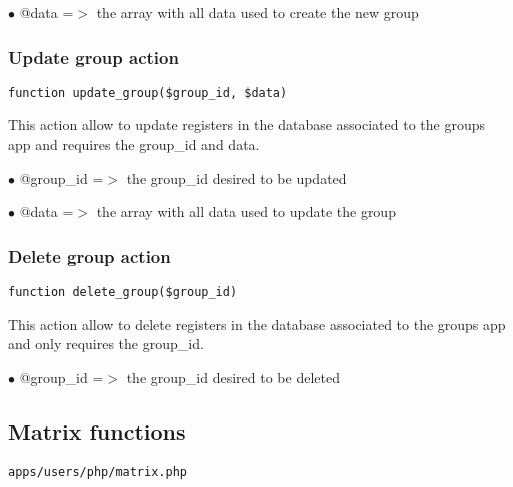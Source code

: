 \documentclass[a4paper]{article}
\begin{document}
\begin{compactitem}
\item[\color{myblue}$\bullet$] @data =$>$ the array with all data used to create the new group
\end{compactitem}

\hypertarget{toc174}{}
\subsubsection{Update group action}

\begin{lstlisting}
function update_group($group_id, $data)
\end{lstlisting}

This action allow to update registers in the database associated to
the groups app and requires the group\_id and data.

\begin{compactitem}
\item[\color{myblue}$\bullet$] @group\_id =$>$ the group\_id desired to be updated
\item[\color{myblue}$\bullet$] @data     =$>$ the array with all data used to update the group
\end{compactitem}

\hypertarget{toc175}{}
\subsubsection{Delete group action}

\begin{lstlisting}
function delete_group($group_id)
\end{lstlisting}

This action allow to delete registers in the database associated to
the groups app and only requires the group\_id.

\begin{compactitem}
\item[\color{myblue}$\bullet$] @group\_id =$>$ the group\_id desired to be deleted
\end{compactitem}

\hypertarget{toc176}{}
\subsection{Matrix functions}

\begin{lstlisting}
apps/users/php/matrix.php
\end{lstlisting}
\end{document}
